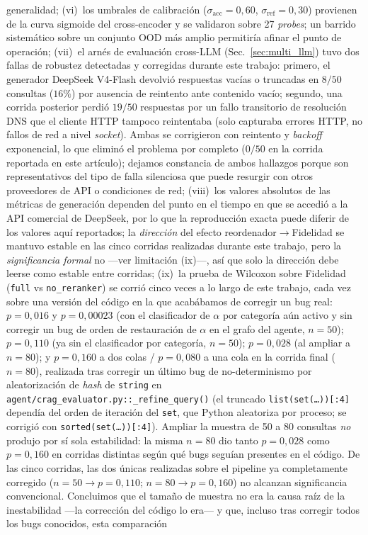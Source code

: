 \documentclass[runningheads]{llncs}
\begin{document}
generalidad; (vi)~los umbrales de calibraci\'{o}n ($\sigma_{\mathrm{acc}}{=}0{,}60$, $\sigma_{\mathrm{ref}}{=}0{,}30$) provienen de la curva sigmoide del cross-encoder y se validaron sobre 27 \emph{probes}; un barrido sistem\'{a}tico sobre un conjunto OOD m\'{a}s amplio permitir\'{i}a afinar el punto de operaci\'{o}n; (vii)~el arn\'{e}s de evaluaci\'{o}n cross-LLM (Sec.~\ref{sec:multi_llm}) tuvo dos fallas de robustez detectadas y corregidas durante este trabajo: primero, el generador DeepSeek V4-Flash devolvi\'{o} respuestas vac\'{i}as o truncadas en $8/50$ consultas ($16\%$) por ausencia de reintento ante contenido vac\'{i}o; segundo, una corrida posterior perdi\'{o} $19/50$ respuestas por un fallo transitorio de resoluci\'{o}n DNS que el cliente HTTP tampoco reintentaba (solo capturaba errores HTTP, no fallos de red a nivel \emph{socket}). Ambas se corrigieron con reintento y \emph{backoff} exponencial, lo que elimin\'{o} el problema por completo ($0/50$ en la corrida reportada en este art\'{i}culo); dejamos constancia de ambos hallazgos porque son representativos del tipo de falla silenciosa que puede resurgir con otros proveedores de API o condiciones de red; (viii)~los valores absolutos de las m\'{e}tricas de generaci\'{o}n dependen del punto en el tiempo en que se accedi\'{o} a la API comercial de DeepSeek, por lo que la reproducci\'{o}n exacta puede diferir de los valores aqu\'{i} reportados; la \emph{direcci\'{o}n} del efecto reordenador$\rightarrow$Fidelidad se mantuvo estable en las cinco corridas realizadas durante este trabajo, pero la \emph{significancia formal} no —ver limitaci\'{o}n (ix)—, as\'{i} que solo la direcci\'{o}n debe leerse como estable entre corridas; (ix)~la prueba de Wilcoxon sobre Fidelidad (\texttt{full} vs \texttt{no\_reranker}) se corri\'{o} cinco veces a lo largo de este trabajo, cada vez sobre una versi\'{o}n del c\'{o}digo en la que acab\'{a}bamos de corregir un bug real: $p{=}0{,}016$ y $p{=}0{,}00023$ (con el clasificador de $\alpha$ por categor\'{i}a a\'{u}n activo y sin corregir un bug de orden de restauraci\'{o}n de $\alpha$ en el grafo del agente, $n{=}50$); $p{=}0{,}110$ (ya sin el clasificador por categor\'{i}a, $n{=}50$); $p{=}0{,}028$ (al ampliar a $n{=}80$); y $p{=}0{,}160$ a dos colas / $p{=}0{,}080$ a una cola en la corrida final ($n{=}80$), realizada tras corregir un \'{u}ltimo bug de no-determinismo por aleatorizaci\'{o}n de \emph{hash} de \texttt{string} en \texttt{agent/crag\_evaluator.py::\_refine\_query()} (el truncado \texttt{list(set(\ldots))[:4]} depend\'{i}a del orden de iteraci\'{o}n del \texttt{set}, que Python aleatoriza por proceso; se corrigi\'{o} con \texttt{sorted(set(\ldots))[:4]}). Ampliar la muestra de 50 a 80 consultas \emph{no} produjo por s\'{i} sola estabilidad: la misma $n{=}80$ dio tanto $p{=}0{,}028$ como $p{=}0{,}160$ en corridas distintas seg\'{u}n qu\'{e} bugs segu\'{i}an presentes en el c\'{o}digo. De las cinco corridas, las dos \'{u}nicas realizadas sobre el pipeline ya completamente corregido ($n{=}50{\to}p{=}0{,}110$; $n{=}80{\to}p{=}0{,}160$) no alcanzan significancia convencional. Concluimos que el tama\~{n}o de muestra no era la causa ra\'{i}z de la inestabilidad —la correcci\'{o}n del c\'{o}digo lo era— y que, incluso tras corregir todos los bugs conocidos, esta comparaci\'{o}n 
\end{document}
